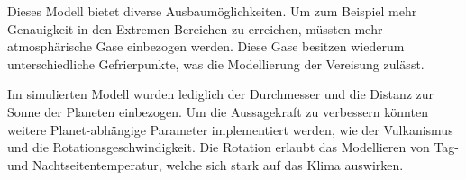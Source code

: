 \begin{refsection}
Dieses Modell bietet diverse Ausbaumöglichkeiten. Um zum Beispiel mehr Genauigkeit in den Extremen Bereichen zu erreichen, müssten mehr atmosphärische Gase einbezogen werden.
Diese Gase besitzen wiederum unterschiedliche Gefrierpunkte, was die Modellierung der Vereisung zulässt.
		
Im simulierten Modell wurden lediglich der Durchmesser und die Distanz zur Sonne der Planeten einbezogen. Um die Aussagekraft zu verbessern könnten weitere Planet-abhängige Parameter implementiert werden, wie der Vulkanismus und die Rotationsgeschwindigkeit. Die Rotation erlaubt das Modellieren von Tag- und Nachtseitentemperatur, welche sich stark auf das Klima auswirken.

\printbibliography[heading=subbibliography]
\end{refsection}
